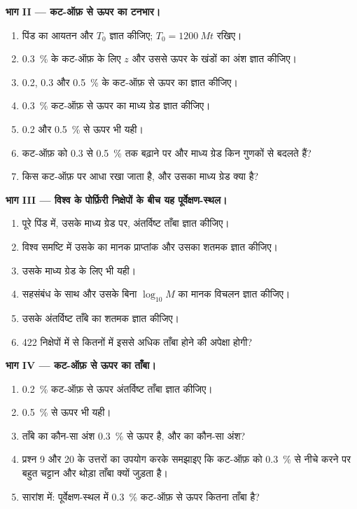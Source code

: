 \begin{problem}[{सप्ताहांत समस्या --- एक पोर्फ़िरी पूर्वेक्षण-स्थल}]
\noindent\textbf{भाग II --- कट-ऑफ़ से ऊपर का टनभार।}
\begin{enumerate}[resume]
  \item पिंड का आयतन और  $T_0$ ज्ञात कीजिए; $T_0 = \qty{1200}{Mt}$ रखिए।
  \item \qty{0.3}{\percent} के कट-ऑफ़ के लिए $z$ और उससे ऊपर के खंडों का अंश ज्ञात कीजिए।
  \item 0.2, 0.3 और \qty{0.5}{\percent} के कट-ऑफ़ से ऊपर का  ज्ञात कीजिए।
  \item \qty{0.3}{\percent} कट-ऑफ़ से ऊपर का माध्य ग्रेड ज्ञात कीजिए।
  \item 0.2 और \qty{0.5}{\percent} से ऊपर भी यही।
  \item कट-ऑफ़ को 0.3 से \qty{0.5}{\percent} तक बढ़ाने पर  और माध्य ग्रेड किन गुणकों से
        बदलते हैं?
  \item किस कट-ऑफ़ पर आधा  रखा जाता है, और उसका माध्य ग्रेड क्या है?
\end{enumerate}

\noindent\textbf{भाग III --- विश्व के पोर्फ़िरी निक्षेपों के बीच यह पूर्वेक्षण-स्थल।}
\begin{enumerate}[resume]
  \item पूरे पिंड में, उसके माध्य ग्रेड पर, अंतर्विष्ट ताँबा ज्ञात कीजिए।
  \item विश्व समष्टि में उसके  का मानक प्राप्तांक और उसका शतमक ज्ञात कीजिए।
  \item उसके माध्य ग्रेड के लिए भी यही।
  \item सहसंबंध के साथ और उसके बिना $\log_{10} M$ का मानक विचलन ज्ञात कीजिए।
  \item उसके अंतर्विष्ट ताँबे का शतमक ज्ञात कीजिए।
  \item 422 निक्षेपों में से कितनों में इससे अधिक ताँबा होने की अपेक्षा होगी?
\end{enumerate}

\noindent\textbf{भाग IV --- कट-ऑफ़ से ऊपर का ताँबा।}
\begin{enumerate}[resume]
  \item \qty{0.2}{\percent} कट-ऑफ़ से ऊपर अंतर्विष्ट ताँबा ज्ञात कीजिए।
  \item \qty{0.5}{\percent} से ऊपर भी यही।
  \item ताँबे का कौन-सा अंश \qty{0.3}{\percent} से ऊपर है, और  का कौन-सा
        अंश?
  \item प्रश्न 9 और 20 के उत्तरों का उपयोग करके समझाइए कि कट-ऑफ़ को \qty{0.3}{\percent} से नीचे करने पर
        बहुत चट्टान और थोड़ा ताँबा क्यों जुड़ता है।
  \item सारांश में: पूर्वेक्षण-स्थल में \qty{0.3}{\percent} कट-ऑफ़ से ऊपर कितना ताँबा है?
\end{enumerate}
\end{problem}
